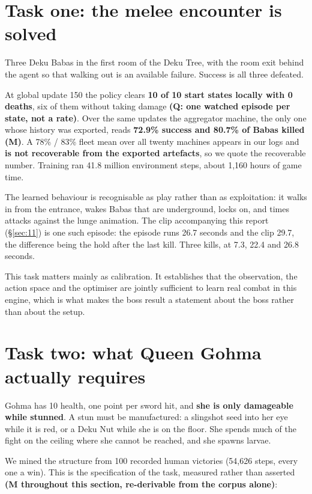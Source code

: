 \documentclass[11pt]{article}
\begin{document}
\section{Task one: the melee encounter is solved}
\label{sec:3}

Three Deku Babas in the first room of the Deku Tree, with the room exit behind the agent so that walking out is an available failure. Success is all three defeated.

At global update 150 the policy clears \textbf{10 of 10 start states locally with 0 deaths}, six of them without taking damage \textbf{(Q: one watched episode per state, not a rate)}. Over the same updates the aggregator machine, the only one whose history was exported, reads \textbf{72.9\% success and 80.7\% of Babas killed (M)}. A 78\% / 83\% fleet mean over all twenty machines appears in our logs and \textbf{is not recoverable from the exported artefacts}, so we quote the recoverable number. Training ran 41.8 million environment steps, about 1,160 hours of game time.

The learned behaviour is recognisable as play rather than as exploitation: it walks in from the entrance, wakes Babas that are underground, locks on, and times attacks against the lunge animation. The clip accompanying this report (\S\ref{sec:11}) is one such episode: the episode runs 26.7 seconds and the clip 29.7, the difference being the hold after the last kill. Three kills, at 7.3, 22.4 and 26.8 seconds.

This task matters mainly as calibration. It establishes that the observation, the action space and the optimiser are jointly sufficient to learn real combat in this engine, which is what makes the boss result a statement about the boss rather than about the setup.


\section{Task two: what Queen Gohma actually requires}
\label{sec:4}

Gohma has 10 health, one point per sword hit, and \textbf{she is only damageable while stunned}. A stun must be manufactured: a slingshot seed into her eye while it is red, or a Deku Nut while she is on the floor. She spends much of the fight on the ceiling where she cannot be reached, and she spawns larvae.

We mined the structure from 100 recorded human victories (54,626 steps, every one a win). This is the specification of the task, measured rather than asserted \textbf{(M throughout this section, re-derivable from the corpus alone)}:
\end{document}

